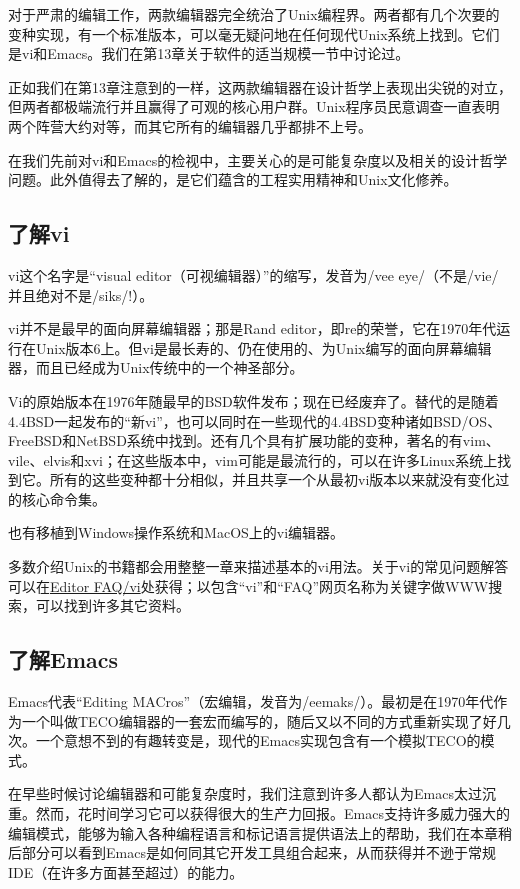 \documentclass[12pt,oneside]{book}
\begin{document}
对于严肃的编辑工作，两款编辑器完全统治了Unix编程界。两者都有几个次要的变种实现，有一个标准版本，可以毫无疑问地在任何现代Unix系统上找到。它们是vi和Emacs。我们在第13章关于软件的适当规模一节中讨论过。

正如我们在第13章注意到的一样，这两款编辑器在设计哲学上表现出尖锐的对立，但两者都极端流行并且赢得了可观的核心用户群。Unix程序员民意调查一直表明两个阵营大约对等，而其它所有的编辑器几乎都排不上号。

在我们先前对vi和Emacs的检视中，主要关心的是可能复杂度以及相关的设计哲学问题。此外值得去了解的，是它们蕴含的工程实用精神和Unix文化修养。

\subsection{了解vi}
vi这个名字是“visual editor（可视编辑器）”的缩写，发音为/vee eye/（不是/vie/并且绝对不是/siks/!）。

vi并不是最早的面向屏幕编辑器；那是Rand editor，即re的荣誉，它在1970年代运行在Unix版本6上。但vi是最长寿的、仍在使用的、为Unix编写的面向屏幕编辑器，而且已经成为Unix传统中的一个神圣部分。

Vi的原始版本在1976年随最早的BSD软件发布；现在已经废弃了。替代的是随着4.4BSD一起发布的“新vi”，也可以同时在一些现代的4.4BSD变种诸如BSD/OS、FreeBSD和NetBSD系统中找到。还有几个具有扩展功能的变种，著名的有vim、vile、elvis和xvi；在这些版本中，vim可能是最流行的，可以在许多Linux系统上找到它。所有的这些变种都十分相似，并且共享一个从最初vi版本以来就没有变化过的核心命令集。

也有移植到Windows操作系统和MacOS上的vi编辑器。

多数介绍Unix的书籍都会用整整一章来描述基本的vi用法。关于vi的常见问题解答可以在\href{http://www.faqs.org/faqs/editor-faq/vi/}{Editor FAQ/vi}处获得；以包含“vi”和“FAQ”网页名称为关键字做WWW搜索，可以找到许多其它资料。


\subsection{了解Emacs}
Emacs代表“Editing MACros”（宏编辑，发音为/eemaks/）。最初是在1970年代作为一个叫做TECO编辑器的一套宏而编写的，随后又以不同的方式重新实现了好几次。一个意想不到的有趣转变是，现代的Emacs实现包含有一个模拟TECO的模式。

在早些时候讨论编辑器和可能复杂度时，我们注意到许多人都认为Emacs太过沉重。然而，花时间学习它可以获得很大的生产力回报。Emacs支持许多威力强大的编辑模式，能够为输入各种编程语言和标记语言提供语法上的帮助，我们在本章稍后部分可以看到Emacs是如何同其它开发工具组合起来，从而获得并不逊于常规IDE（在许多方面甚至超过）的能力。
\end{document}
